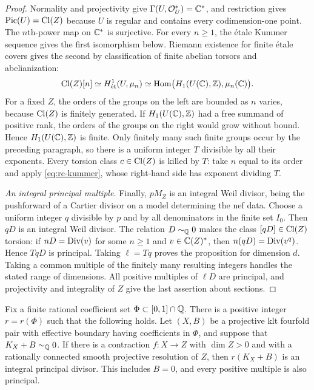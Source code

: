 \begin{proof}
Normality and projectivity give
$\Gamma(U,\mathcal O_U^*)=\mathbb C^*$, and restriction gives
$\operatorname{Pic}(U)=\operatorname{Cl}(Z)$ because $U$ is regular and contains every
codimension-one point.  The $n$th-power map on $\mathbb C^*$ is surjective.
For every $n\geq1$, the \'etale Kummer sequence
\cite[Tag~03PK]{StacksProject} gives the first isomorphism below.
Riemann existence for finite \'etale covers
\cite[Expos\'e~XII, Th\'eor\`eme~5.1 and Corollaire~5.2]{SGA1} gives the
second by classification of finite abelian torsors and abelianization:
\begin{equation}\label{eq:rc-kummer}
 \operatorname{Cl}(Z)[n]
 \simeq H^1_{\mathrm{\acute et}}(U,\mu_n)
 \simeq
 \operatorname{Hom}\bigl(H_1(U(\mathbb C),\mathbb Z),\mu_n(\mathbb C)\bigr).
\end{equation}
For a fixed $Z$, the orders of the groups on the left are bounded as $n$
varies, because $\operatorname{Cl}(Z)$ is finitely generated.  If $H_1(U(\mathbb C),\mathbb Z)$ had
a free summand of positive rank, the orders of the groups on the right
would grow without bound.  Hence $H_1(U(\mathbb C),\mathbb Z)$ is finite.  Only finitely
many such finite groups occur by the preceding paragraph, so there is a
uniform integer $T$ divisible by all their exponents.  Every torsion class
$c\in\operatorname{Cl}(Z)$ is killed by $T$: take $n$ equal to its order and apply
\eqref{eq:rc-kummer}, whose right-hand side has exponent dividing $T$.

\smallskip
\noindent\emph{An integral principal multiple.}
Finally, $pM_Z$ is an integral Weil divisor, being the pushforward of a
Cartier divisor on a model determining the nef data.  Choose a uniform
integer $q$ divisible by $p$ and by all denominators in the finite set
$I_0$.  Then $qD$ is an integral Weil divisor.  The relation
$D\sim_{\mathbb Q}0$ makes the class $[qD]\in\operatorname{Cl}(Z)$ torsion: if
$nD=\operatorname{Div}(v)$ for some $n\geq1$ and $v\in\mathbb C(Z)^*$, then
$n(qD)=\operatorname{Div}(v^q)$.  Hence
$TqD$ is principal.  Taking $\ell=Tq$ proves the proposition for dimension
$d$.  Taking a common multiple of the finitely many resulting integers
handles the stated range of dimensions.  All positive multiples of
$\ell D$ are principal, and projectivity and integrality of $Z$ give the
last assertion about sections.
\end{proof}

\begin{corollary}\label{cor:relative-rc-torsion}
Fix a finite rational coefficient set $\Phi\subset[0,1]\cap\mathbb Q$.
There is a positive integer $r=r(\Phi)$ such that the following holds.
Let $(X,B)$ be a projective klt fourfold pair with effective boundary
having coefficients in $\Phi$, and suppose that
$K_X+B\sim_{\mathbb Q}0$.  If there is a contraction $f:X\to Z$ with
$\dim Z>0$ and with a rationally connected smooth projective resolution
of $Z$, then $r(K_X+B)$ is an integral principal divisor. This includes
$B=0$, and every positive multiple is also principal.
\end{corollary}

